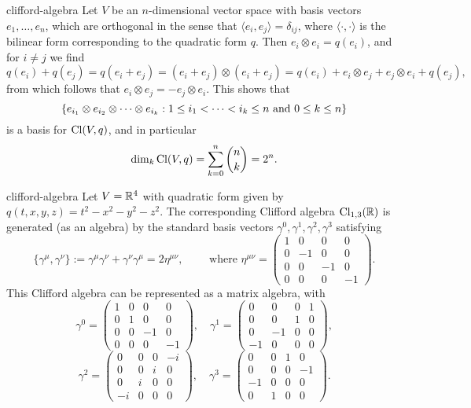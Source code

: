 \begin{example}{clifford-algebra}
    Let $V$ be an $n$-dimensional vector space with basis vectors $e_1, \ldots, e_n$, which are orthogonal in the sense that $\langle e_i, e_j \rangle = \delta_{ij}$, where $\langle \cdot, \cdot \rangle$ is the bilinear form corresponding to the quadratic form $q$. Then $e_i \otimes e_i = q(e_i)$, and for $i \ne j$ we find
    \[ q(e_i) + q(e_j) = q(e_i + e_j) = (e_i + e_j) \otimes (e_i + e_j) = q(e_i) + e_i \otimes e_j + e_j \otimes e_i + q(e_j) , \]
    from which follows that $e_i \otimes e_j = - e_j \otimes e_i$. This shows that
    \[ \{ e_{i_1} \otimes e_{i_2} \otimes \cdots \otimes e_{i_k} : 1 \le i_1 < \cdots < i_k \le n \textup{ and } 0 \le k \le n  \} \]
    is a basis for $\textup{Cl}(V, q)$, and in particular
    \[ \dim_k \textup{Cl}(V, q) = \sum_{k = 0}^{n} \binom{n}{k} = 2^n . \]
\end{example}

\begin{example}{clifford-algebra}
    Let $V = \mathbb{R}^4$ with quadratic form given by $q(t, x, y, z) = t^2 - x^2 - y^2 - z^2$. The corresponding Clifford algebra $\textup{Cl}_{1,3}(\mathbb{R})$ is generated (as an algebra) by the standard basis vectors $\gamma^0, \gamma^1, \gamma^2, \gamma^3$ satisfying
    \[ \{ \gamma^\mu, \gamma^\nu \} := \gamma^\mu \gamma^\nu + \gamma^\nu \gamma^\mu = 2 \eta^{\mu \nu} , \qquad \text{ where } \eta^{\mu \nu} = \begin{pmatrix} 1 & 0 & 0 & 0 \\ 0 & -1 & 0 & 0 \\ 0 & 0 & -1 & 0 \\ 0 & 0 & 0 & -1 \end{pmatrix} . \]
    This Clifford algebra can be represented as a matrix algebra, with
    \[
        \gamma^0 = \begin{pmatrix} 1 & 0 & 0 & 0 \\ 0 & 1 & 0 & 0 \\ 0 & 0 & -1 & 0 \\ 0 & 0 & 0 & -1 \end{pmatrix} , \quad
        \gamma^1 = \begin{pmatrix} 0 & 0 & 0 & 1 \\ 0 & 0 & 1 & 0 \\ 0 & -1 & 0 & 0 \\ -1 & 0 & 0 & 0 \end{pmatrix} , \]
    \[
        \gamma^2 = \begin{pmatrix} 0 & 0 & 0 & -i \\ 0 & 0 & i & 0 \\ 0 & i & 0 & 0 \\ -i & 0 & 0 & 0 \end{pmatrix} , \quad
        \gamma^3 = \begin{pmatrix} 0 & 0 & 1 & 0 \\ 0 & 0 & 0 & -1 \\ -1 & 0 & 0 & 0 \\ 0 & 1 & 0 & 0 \end{pmatrix} .
    \]
\end{example}


